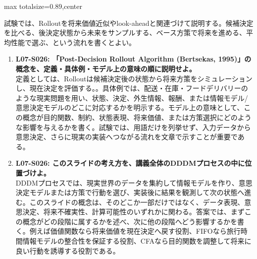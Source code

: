 \begin{minipage}[t]{0.58\textwidth}
\begin{adjustbox}{max totalsize={\textwidth}{0.89\textheight},center}
\begin{minipage}{\textwidth}
試験では、Rolloutを将来価値近似やlook-aheadと関連づけて説明する。候補決定を比べる、後決定状態から未来をサンプルする、ベース方策で将来を進める、平均性能で選ぶ、という流れを書くとよい。\par{}\begin{enumerate}\item \textbf{L07-S026: 「Post-Decision Rollout Algorithm (Bertsekas, 1995)」の概念を、定義・具体例・モデル上の意味の順に説明せよ。}\\定義としては、Rolloutは候補決定後の状態から将来方策をシミュレーションし、現在決定を評価する。。具体例では、配送・在庫・フードデリバリーのような現実問題を用い、状態、決定、外生情報、報酬、または情報モデル/意思決定モデルのどこに対応するかを明示する。モデル上の意味として、この概念が目的関数、制約、状態表現、将来価値、または方策選択にどのような影響を与えるかを書く。試験では、用語だけを列挙せず、入力データから意思決定、さらに現実の実装へつながる流れを文章で示すことが重要である。\item \textbf{L07-S026: このスライドの考え方を、講義全体のDDDMプロセスの中に位置づけよ。}\\DDDMプロセスでは、現実世界のデータを集約して情報モデルを作り、意思決定モデルまたは方策で行動を選び、実装後に結果を観測して次の状態へ進む。このスライドの概念は、そのどこか一部だけではなく、データ表現、意思決定、将来不確実性、計算可能性のいずれかに関わる。答案では、まずこの概念がどの段階に属するかを述べ、次に他の段階へどう影響するかを書く。例えば価値関数なら将来価値を現在決定へ戻す役割、FIFOなら旅行時間情報モデルの整合性を保証する役割、CFAなら目的関数を調整して将来に良い行動を誘導する役割である。\end{enumerate}
\end{minipage}
\end{adjustbox}
\end{minipage}


